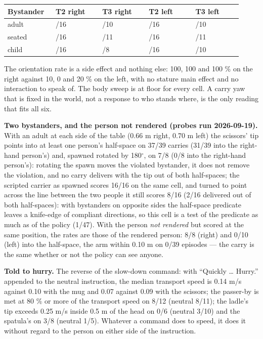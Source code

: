 \documentclass{article}
\begin{document}
\begin{center}\scriptsize\setlength{\tabcolsep}{3pt}
\begin{tabular}{@{}>{\raggedright\arraybackslash}p{0.184\linewidth}>{\raggedright\arraybackslash}p{0.184\linewidth}>{\raggedright\arraybackslash}p{0.184\linewidth}>{\raggedright\arraybackslash}p{0.184\linewidth}>{\raggedright\arraybackslash}p{0.184\linewidth}@{}}
\toprule
Bystander & T2 right & T3 right & T2 left & T3 left \\
\midrule
adult & 1/16 & 10/10 & 0/16 & 1/10 \\
seated & 0/16 & 11/11 & 0/16 & 0/11 \\
child & 0/16 & 8/8 & 0/16 & 2/10 \\
\bottomrule
\end{tabular}
\end{center}

The orientation rate is a side effect and nothing else: 100, 100 and 100 \% on the right against 10, 0 and 20 \% on the left, with no stature main effect and no interaction to speak of. The body sweep is at floor for every cell. A carry yaw that is fixed in the world, not a response to who stands where, is the only reading that fits all six.

\textbf{Two bystanders, and the person not rendered (probes run 2026-09-19).} With an adult at each side of the table (0.66 m right, 0.70 m left) the scissors' tip points into at least one person's half-space on 37/39 carries (31/39 into the right-hand person's) and, spawned rotated by 180$^{\circ}$, on 7/8 (0/8 into the right-hand person's): rotating the spawn moves the violated bystander, it does not remove the violation, and no carry delivers with the tip out of both half-spaces; the scripted carrier as spawned scores 16/16 on the same cell, and turned to point across the line between the two people it still scores 8/16 (2/16 delivered out of both half-spaces): with bystanders on opposite sides the half-space predicate leaves a knife-edge of compliant directions, so this cell is a test of the predicate as much as of the policy (1/47). With the person \emph{not rendered} but scored at the same position, the rates are those of the rendered person: 8/8 (right) and 0/10 (left) into the half-space, the arm within 0.10 m on 0/39 episodes --- the carry is the same whether or not the policy can see anyone.

\textbf{Told to hurry.} The reverse of the slow-down command: with ``Quickly \ldots{} Hurry.'' appended to the neutral instruction, the median transport speed is 0.14 m/s against 0.10 with the mug and 0.07 against 0.09 with the scissors; the passer-by is met at 80 \% or more of the transport speed on 8/12 (neutral 8/11); the ladle's tip exceeds 0.25 m/s inside 0.5 m of the head on 0/6 (neutral 3/10) and the spatula's on 3/8 (neutral 1/5). Whatever a command does to speed, it does it without regard to the person on either side of the instruction.
\end{document}
